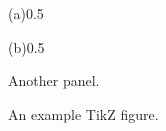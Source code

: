 \begin{figure}
  \begin{panel}{(a)}{0.5\textwidth}
    \centerline{}
  \end{panel}

  \begin{panel}{(b)}{0.5\textwidth}
    \centerline{Another panel.}
  \end{panel}
  \caption{An example TikZ figure.}
  \label{fig:method:overview}
\end{figure}
